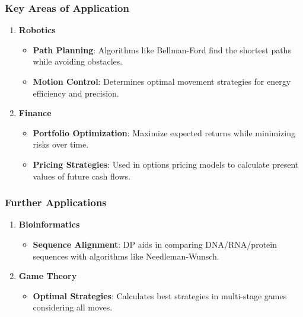 \documentclass[aspectratio=169]{beamer}
\begin{document}
\begin{frame}[fragile]
    \frametitle{Key Areas of Application}
    \begin{enumerate}
        \item \textbf{Robotics}
            \begin{itemize}
                \item \textbf{Path Planning}: Algorithms like Bellman-Ford find the shortest paths while avoiding obstacles.
                \item \textbf{Motion Control}: Determines optimal movement strategies for energy efficiency and precision.
            \end{itemize}
        \item \textbf{Finance}
            \begin{itemize}
                \item \textbf{Portfolio Optimization}: Maximize expected returns while minimizing risks over time.
                \item \textbf{Pricing Strategies}: Used in options pricing models to calculate present values of future cash flows.
            \end{itemize}
    \end{enumerate}
\end{frame}

\begin{frame}[fragile]
    \frametitle{Further Applications}
    \begin{enumerate}[resume]
        \item \textbf{Bioinformatics}
            \begin{itemize}
                \item \textbf{Sequence Alignment}: DP aids in comparing DNA/RNA/protein sequences with algorithms like Needleman-Wunsch.
            \end{itemize}
        \item \textbf{Game Theory}
            \begin{itemize}
                \item \textbf{Optimal Strategies}: Calculates best strategies in multi-stage games considering all moves.
            \end{itemize}
    \end{enumerate}
\end{frame}
\end{document}
